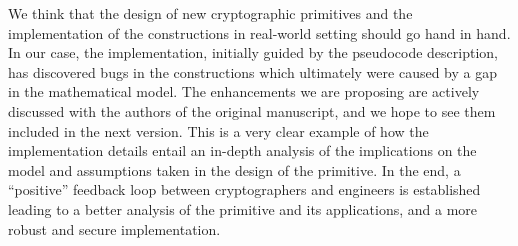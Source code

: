 We think that the design of new cryptographic primitives and
the implementation of the constructions in real-world
setting should go hand in hand. 
In our case, the implementation, 
initially guided by the pseudocode 
description, has discovered bugs in the constructions which
ultimately were caused by a gap in the mathematical model.
The enhancements we are proposing are actively discussed
with the authors of the original manuscript, and we hope
to see them included in the next version.
This is a very clear
example of how the implementation details entail
an in-depth analysis of the implications on the model and 
assumptions taken in the design of the primitive.
In the end, a ``positive'' feedback loop between cryptographers 
and engineers is established leading to
a better analysis of the primitive and its applications,
and a more robust and secure implementation.

